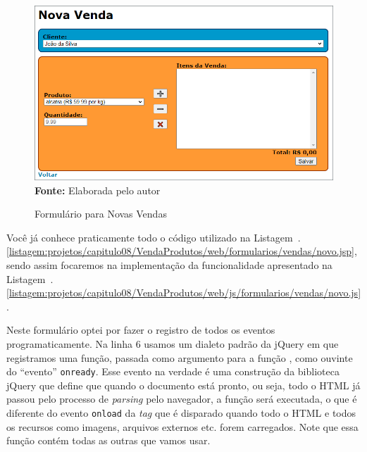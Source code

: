 \FloatBarrier
\begin{figure}[!htbp]
    \centering
    \caption{Formulário para Novas Vendas}
    \includegraphics[scale=0.7]{imagens/cap08FormularioNovaVenda}
    \\\textbf{Fonte:} Elaborada pelo autor
    \label{fig:cap08FormularioNovaVenda}
\end{figure}
\FloatBarrier

Você já conhece praticamente todo o código utilizado na Listagem~\thechapter.\ref{listagem:projetos/capitulo08/VendaProdutos/web/formularios/vendas/novo.jsp}, sendo assim focaremos na implementação da funcionalidade apresentado na Listagem~\thechapter.\ref{listagem:projetos/capitulo08/VendaProdutos/web/js/formularios/vendas/novo.js}.


Neste formulário optei por fazer o registro de todos os eventos programaticamente. Na linha 6 usamos um dialeto padrão da jQuery em que registramos uma função, passada como argumento para a função , como ouvinte do ``evento'' \texttt{onready}. Esse evento na verdade é uma construção da biblioteca jQuery que define que quando o documento está pronto, ou seja, todo o HTML já passou pelo processo de \textit{parsing} pelo navegador, a função será executada, o que é diferente do evento \texttt{onload} da \textit{tag}  que é disparado quando todo o HTML e todos os recursos como imagens, arquivos externos etc. forem carregados. Note que essa função contém todas as outras que vamos usar.

